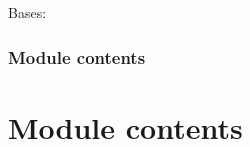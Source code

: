 \documentclass[letterpaper,10pt,english]{sphinxmanual}
\begin{document}
\begin{fulllineitems}
\label{dessn.simulation:dessn.simulation.simulation.Simulation}
Bases: 

\begin{fulllineitems}
\label{dessn.simulation:dessn.simulation.simulation.Simulation.get_simulation}
\end{fulllineitems}


\end{fulllineitems}



\subsubsection{Module contents}
\label{dessn.simulation:module-contents}\label{dessn.simulation:module-dessn.simulation}

\section{Module contents}
\label{dessn:module-dessn}\label{dessn:module-contents}
\end{document}
